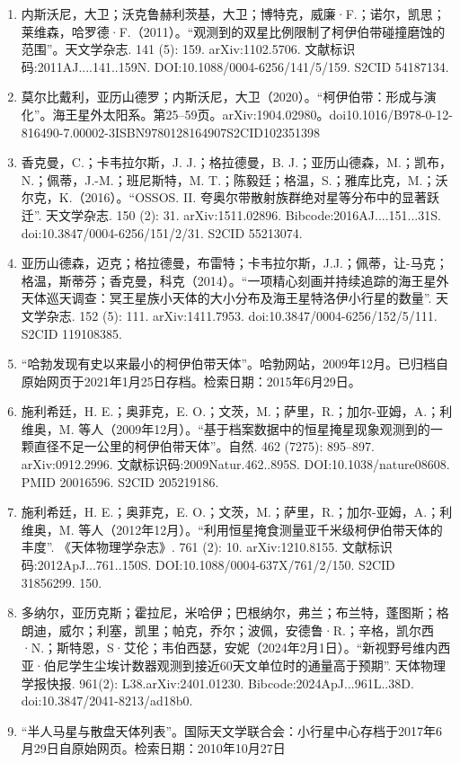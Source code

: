 \begin{enumerate}
\item 内斯沃尼，大卫；沃克鲁赫利茨基，大卫；博特克，威廉·F.；诺尔，凯思；莱维森，哈罗德·F.（2011）。“观测到的双星比例限制了柯伊伯带碰撞磨蚀的范围”。天文学杂志. 141 (5): 159. arXiv:1102.5706. 文献标识码:2011AJ....141..159N. DOI:10.1088/0004-6256/141/5/159. S2CID 54187134.
\item 莫尔比戴利，亚历山德罗；内斯沃尼，大卫（2020）。“柯伊伯带：形成与演化”。海王星外太阳系。第25–59页。arXiv:1904.02980。doi10.1016/B978-0-12-816490-7.00002-3ISBN9780128164907S2CID102351398
\item 香克曼，C.；卡韦拉尔斯，J. J.；格拉德曼，B. J.；亚历山德森，M.；凯布，N.；佩蒂，J.-M.；班尼斯特，M. T.；陈毅廷；格温，S.；雅库比克，M.；沃尔克，K.（2016）。“OSSOS. II. 夸奥尔带散射族群绝对星等分布中的显著跃迁”. 天文学杂志. 150 (2): 31. arXiv:1511.02896. Bibcode:2016AJ....151...31S. doi:10.3847/0004-6256/151/2/31. S2CID 55213074.
\item 亚历山德森，迈克；格拉德曼，布雷特；卡韦拉尔斯，J.J.；佩蒂，让-马克；格温，斯蒂芬；香克曼，科克（2014）。“一项精心刻画并持续追踪的海王星外天体巡天调查：冥王星族小天体的大小分布及海王星特洛伊小行星的数量”. 天文学杂志. 152 (5): 111. arXiv:1411.7953. doi:10.3847/0004-6256/152/5/111. S2CID 119108385.
\item “哈勃发现有史以来最小的柯伊伯带天体”。哈勃网站，2009年12月。已归档自原始网页于2021年1月25日存档。检索日期：2015年6月29日。
\item 施利希廷，H. E.；奥菲克，E. O.；文茨，M.；萨里，R.；加尔-亚姆，A.；利维奥，M. 等人（2009年12月）。“基于档案数据中的恒星掩星现象观测到的一颗直径不足一公里的柯伊伯带天体”。自然. 462 (7275): 895–897. arXiv:0912.2996. 文献标识码:2009Natur.462..895S. DOI:10.1038/nature08608. PMID 20016596. S2CID 205219186.
\item 施利希廷，H. E.；奥菲克，E. O.；文茨，M.；萨里，R.；加尔-亚姆，A.；利维奥，M. 等人（2012年12月）。“利用恒星掩食测量亚千米级柯伊伯带天体的丰度”. 《天体物理学杂志》. 761 (2): 10. arXiv:1210.8155. 文献标识码:2012ApJ...761..150S. DOI:10.1088/0004-637X/761/2/150. S2CID 31856299. 150.
\item 多纳尔，亚历克斯；霍拉尼，米哈伊；巴根纳尔，弗兰；布兰特，蓬图斯；格朗迪，威尔；利塞，凯里；帕克，乔尔；波佩，安德鲁·R.；辛格，凯尔西·N.；斯特恩，S·艾伦；韦伯西瑟，安妮（2024年2月1日）。“新视野号维内西亚·伯尼学生尘埃计数器观测到接近60天文单位时的通量高于预期”. 天体物理学报快报. 961(2): L38.arXiv:2401.01230. Bibcode:2024ApJ...961L..38D. doi:10.3847/2041-8213/ad18b0.
\item “半人马星与散盘天体列表”。国际天文学联合会：小行星中心存档于2017年6月29日自原始网页。检索日期：2010年10月27日

\end{enumerate}
